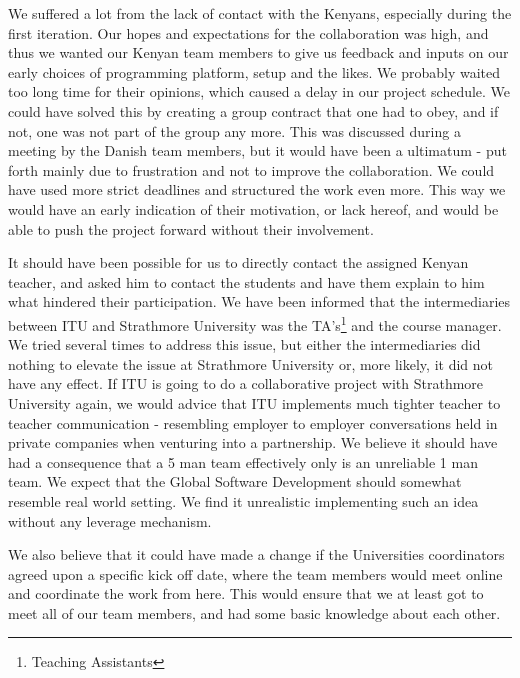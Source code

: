 We suffered a lot from the lack of contact with the Kenyans, especially during the first iteration. Our hopes and expectations for the collaboration was high, and thus we wanted our Kenyan team members to give us feedback and inputs on our early choices of programming platform, setup and the likes. We probably waited too long time for their opinions, which caused a delay in our project schedule. We could have solved this by creating a group contract that one had to obey, and if not, one was not part of the group any more. This was discussed during a meeting by the Danish team members, but it would have been a ultimatum - put forth mainly due to frustration and not to improve the collaboration. We could have used more strict deadlines and structured the work even more. This way we would have an early indication of their motivation, or lack hereof, and would be able to push the project forward without their involvement. 

It should have been possible for us to directly contact the assigned Kenyan teacher, and asked him to contact the students and have them explain to him what hindered their participation. We have been informed that the intermediaries between ITU and Strathmore University was the TA's\footnote{Teaching Assistants} and the course manager. We tried several times to address this issue, but either the intermediaries did nothing to elevate the issue at Strathmore University or, more likely, it did not have any effect. If ITU is going to do a collaborative project with Strathmore University again, we would advice that ITU implements much tighter teacher to teacher communication - resembling employer to employer conversations held in private companies when venturing into a partnership. We believe it should have had a consequence that a 5 man team effectively only is an unreliable 1 man team. We expect that the Global Software Development should somewhat resemble real world setting. We find it unrealistic implementing such an idea without any leverage mechanism.

We also believe that it could have made a change if the Universities coordinators agreed upon a specific kick off date, where the team members would meet online and coordinate the work from here. This would ensure that we at least got to meet all of our team members, and had some basic knowledge about each other. 

